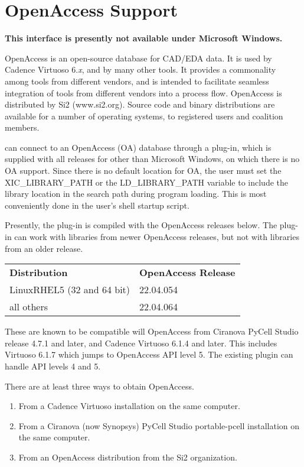 \section{OpenAccess Support}
\label{oaplugin}

{\bf This interface is presently not available under Microsoft Windows.}

OpenAccess is an open-source database for CAD/EDA data.  It is used
by Cadence Virtuoso 6.{\it x\/}, and by many other tools.  It provides
a commonality among tools from different vendors, and is intended to
facilitate seamless integration of tools from different vendors into a
process flow.  OpenAccess is distributed by Si2 ({\vt www.si2.org}). 
Source code and binary distributions are available for a number of
operating systems, to registered users and coalition members.

{\Xic} can connect to an OpenAccess (OA) database through a plug-in,
which is supplied with all {\Xic} releases for other than Microsoft
Windows, on which there is no OA support.  Since there is no default
location for OA, the user must set the {\vt XIC\_LIBRARY\_PATH} or the
{\vt LD\_LIBRARY\_PATH} variable to include the library location in
the search path during program loading.  This is most conveniently
done in the user's shell startup script.

Presently, the plug-in is compiled with the OpenAccess releases below. 
The plug-in can work with libraries from newer OpenAccess releases,
but not with libraries from an older release.
 
\begin{tabular}{ll}
\bf Distribution & \bf OpenAccess Release\\
LinuxRHEL5 (32 and 64 bit) & 22.04.054\\
all others & 22.04.064\\
\end{tabular}
 
These are known to be compatible will OpenAccess from Ciranova PyCell
Studio release 4.7.1 and later, and Cadence Virtuoso 6.1.4 and later. 
This includes Virtuoso 6.1.7 which jumps to OpenAccess API level 5. 
The existing plugin can handle API levels 4 and 5.

There are at least three ways to obtain OpenAccess.
\begin{enumerate}
\item{From a Cadence Virtuoso installation on the same computer.}
\item{From a Ciranova (now Synopsys) PyCell Studio portable-pcell
  installation on the same computer.}
\item{From an OpenAccess distribution from the Si2 organization.}
\end{enumerate}

